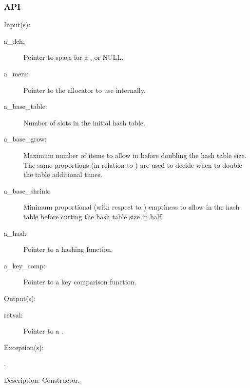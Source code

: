 \subsubsection{API}
\begin{capi}

\label{dch_new}
	\begin{capilist}
	\item[Input(s): ]
		\begin{description}\item[]
		\item[a\_dch: ]
			Pointer to space for a , or NULL.
		\item[a\_mem: ]
			Pointer to the allocator to use internally.
		\item[a\_base\_table: ]
			Number of slots in the initial hash table.
		\item[a\_base\_grow: ]
			Maximum number of items to allow in  before
			doubling the hash table size.  The same proportions (in
			relation to ) are used to decide
			when to double the table additional times.
		\item[a\_base\_shrink: ]
			Minimum proportional (with respect to
			) emptiness to allow in the hash
			table before cutting the hash table size in half.
		\item[a\_hash: ]
			Pointer to a hashing function.
		\item[a\_key\_comp: ]
			Pointer to a key comparison function.
		\end{description}
	\item[Output(s): ]
		\begin{description}\item[]
		\item[retval: ]
			Pointer to a .
		\end{description}
	\item[Exception(s): ]
		\begin{description}\item[]
		\item[.]
		\end{description}
	\item[Description: ]
		Constructor.
	\end{capilist}

\end{capi}
